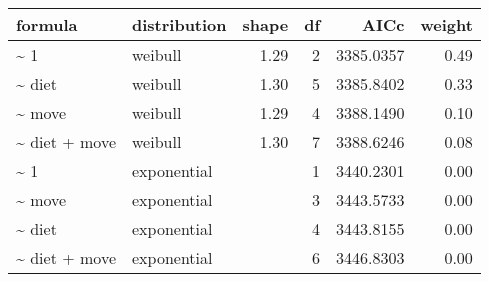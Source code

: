 \begin{table}[ht]
\centering
\begin{tabular}{llrrrr}
 formula & distribution & shape & df & AICc & weight \\ 
  \hline
\~{} 1 & weibull & 1.29 & 2 & 3385.0357 & 0.49 \\ 
  \~{} diet & weibull & 1.30 & 5 & 3385.8402 & 0.33 \\ 
  \~{} move & weibull & 1.29 & 4 & 3388.1490 & 0.10 \\ 
  \~{} diet + move & weibull & 1.30 & 7 & 3388.6246 & 0.08 \\ 
  \~{} 1 & exponential &  & 1 & 3440.2301 & 0.00 \\ 
  \~{} move & exponential &  & 3 & 3443.5733 & 0.00 \\ 
  \~{} diet & exponential &  & 4 & 3443.8155 & 0.00 \\ 
  \~{} diet + move & exponential &  & 6 & 3446.8303 & 0.00 \\ 
  \end{tabular}
\label{tab:erg}
\end{table}
